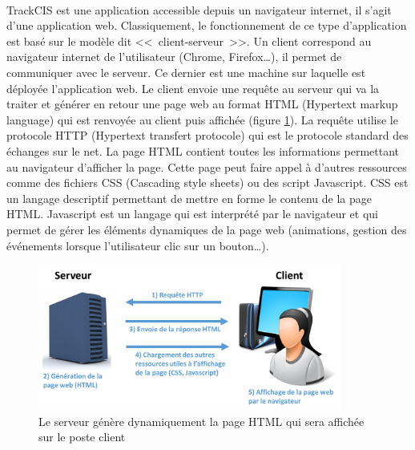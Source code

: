 			\paragraph{}%
			TrackCIS est une application accessible depuis un navigateur internet, il
			s'agit d'une application web. Classiquement, le fonctionnement de ce type
			d'application est basé sur le modèle dit <<~client-serveur~>>. Un client
			correspond au navigateur internet de l'utilisateur (Chrome, Firefox\ldots),
			il permet de communiquer avec le serveur. Ce dernier est une machine sur
			laquelle est déployée l'application web. Le client envoie une requête au
			serveur qui va la traiter et générer en retour une page web au format HTML
			(Hypertext markup language) qui est renvoyée au client puis affichée
			(figure \ref{client_serveur}). La requête utilise le protocole HTTP
			(Hypertext transfert protocole) qui est le protocole standard des échanges
			sur le net. La page HTML contient toutes les informations permettant au
			navigateur d'afficher la page. Cette page peut faire appel à d'autres
			ressources comme des fichiers CSS (Cascading style sheets) ou des script
			Javascript. CSS est un langage descriptif permettant de mettre en forme le
			contenu de la page HTML.
			Javascript est un langage qui est interprété par le navigateur et qui
			permet de gérer les éléments dynamiques de la page web (animations, gestion
			des événements lorsque l'utilisateur clic sur un bouton\ldots).
			\begin{figure}[H]
				\centering
				\includegraphics[width=10cm]{../img/part3/client_serveur.png}
				\caption{\label{client_serveur} Le serveur génère dynamiquement la page
				HTML qui sera affichée sur le poste client}
			\end{figure}
			
